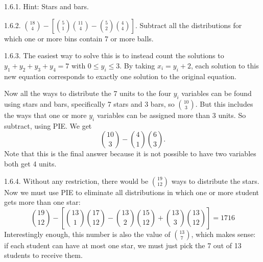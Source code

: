  \protect {} \protect \begin {itemize} 
\begin{ans}{1.6.1.}
  Hint: Stars and bars.
  
\end{ans}
\begin{ans}{1.6.2.}
 ${18 \choose 4} - \left[ {5 \choose 1}{11 \choose 4} - {5 \choose 2}{4 \choose 4}\right]$.  Subtract all the distributions for which one or more bins contain 7 or more balls.  %
	
\end{ans}
\begin{ans}{1.6.3.}
	The easiest way to solve this is to instead count the solutions to $y_1 + y_2 + y_3 + y_4 = 7$ with $0 \le y_i \le 3$.  By taking $x_i = y_i+2$, each solution to this new equation corresponds to exactly one solution to the original equation.

	Now all the ways to distribute the 7 units to the four $y_i$ variables can be found using stars and bars, specifically 7 stars and 3 bars, so ${10 \choose 3}$.  But this includes the ways that one or more $y_i$ variables can be assigned more than 3 units.  So subtract, using PIE.  We get
	\[{10 \choose 3} - {4\choose 1} {6 \choose 3}.\]
	Note that this is the final answer because it is not possible to have two variables both get 4 units.
	
\end{ans}
\begin{ans}{1.6.4.}
		Without any restriction, there would be ${19\choose 12}$ ways to distribute the stars.  Now we must use PIE to eliminate all distributions in which one or more student gets more than one star:
		\[{19 \choose 12} - \left[{13 \choose 1}{17 \choose 12} - {13\choose 2}{15 \choose 12} + {13\choose 3}{13 \choose 12}\right] = 1716\]
		Interestingly enough, this number is also the value of ${13 \choose 7}$, which makes sense: if each student can have at most one star, we must just pick the 7 out of 13 students to receive them.
	

\end{ans}
\end{itemize}
